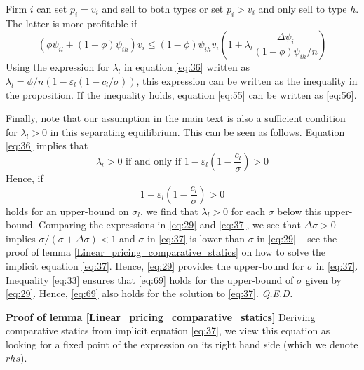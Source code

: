 \documentclass[a4paper,12pt]{article}
\newcommand{\qed}{\hspace*{\fill} {\em Q.E.D.}}
\begin{document}
Firm \(i\) can set \(p_i = v_i\) and sell to both types or set \(p_i>v_i\) and only sell to type \(h\). The latter is more profitable if
\begin{equation}
\label{eq:3}
(\phi \psi_{il} + (1-\phi)\psi_{ih})v_i \leq (1-\phi)\psi_{ih} v_i \left( 1+\lambda_l \frac{\Delta \psi_i}{(1-\phi)\psi_{ih}/n} \right)
\end{equation}
Using the expression for \(\lambda_l\) in equation \eqref{eq:36} written as \(\lambda_l = \phi/n (1 - \varepsilon_l (1-c_{l}/\sigma))\), this expression can be written as the inequality in the proposition. If the inequality holds, equation \eqref{eq:55} can be written as \eqref{eq:56}.

Finally, note that our assumption in the main text is also a sufficient condition for \(\lambda_l > 0\) in this separating equilibrium. This can be seen as follows. Equation \eqref{eq:36} implies that
\begin{equation}
\label{eq:68}
\lambda_l > 0 \text{ if and only if } 1-\varepsilon_l \left(1-\frac{c_l}{\sigma} \right) > 0
\end{equation}
Hence, if
\begin{equation}
\label{eq:69}
1-\varepsilon_l \left(1-\frac{c_l}{\sigma} \right) > 0
\end{equation}
holds for an upper-bound on \(\sigma_l\), we find that \(\lambda_l > 0\) for each \(\sigma\) below this upper-bound. Comparing the expressions in \eqref{eq:29} and \eqref{eq:37}, we see that \(\Delta \sigma > 0\) implies \(\sigma/(\sigma+\Delta\sigma)<1\) and \(\sigma\) in \eqref{eq:37} is lower than \(\sigma\) in \eqref{eq:29} -- see the proof of lemma \ref{Linear_pricing_comparative_statics} on how to solve the implicit equation \eqref{eq:37}. Hence, \eqref{eq:29} provides the upper-bound for \(\sigma\) in \eqref{eq:37}. Inequality \eqref{eq:33} ensures that \eqref{eq:69} holds for the upper-bound of \(\sigma\) given by \eqref{eq:29}. Hence, \eqref{eq:69} also holds for the solution to \eqref{eq:37}. 
 \qed

\textbf{Proof of lemma \ref{Linear_pricing_comparative_statics}}
Deriving comparative statics from implicit equation \eqref{eq:37}, we view this equation as looking for a fixed point of the expression on its right hand side (which we denote \(rhs\)).
\end{document}
